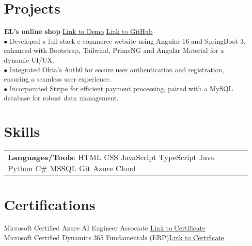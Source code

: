 \documentclass[letterpaper,12pt]{article}
\begin{document}
\section{Projects}

\textbf{EL's online shop} \hfill \href{https://youtu.be/q0_N9ydf67c}{Link to Demo} \hspace{0.2cm} \href{https://github.com/Zicheng-Li/Angular-ecommerce-frontend}{Link to GitHub}\\
\hspace{0.1cm} $\bullet$ \hspace{0.35em}Developed a full-stack e-commerce website using Angular 16 and SpringBoot 3, enhanced with Bootstrap, Tailwind, PrimeNG and Angular Material for a dynamic UI/UX. \\
\hspace{0.1cm} $\bullet$ \hspace{0.35em}Integrated Okta's Auth0 for secure user authentication and registration, ensuring a seamless user experience. \\ 
\hspace{0.1cm} $\bullet$ \hspace{0.35em}Incorporated Stripe for efficient payment processing, paired with a MySQL database for robust data management.

\section{Skills}
\begin{tabularx}{\linewidth}{@{}l X@{}}
\textbf{Languages/Tools}:  HTML \hspace{0.05cm} CSS \hspace{0.05cm} JavaScript \hspace{0.05cm} TypeScript \hspace{0.05cm} Java \hspace{0.05cm} Python \hspace{0.05cm} C\# \hspace{0.05cm} MSSQL \hspace{0.05cm} Git \hspace{0.19cm}Azure Cloud 
\end{tabularx}

\section{Certifications}
Microsoft Certified Azure AI Engineer Associate \hfill \href{https://learn.microsoft.com/en-us/users/zichengli-4388/credentials/8f80de9e7944a10}{Link to Certificate}\\
Microsoft Certified Dynamics 365 Fundamentals (ERP)\hfill \href{https://learn.microsoft.com/en-us/users/zichengli-4388/credentials/5d28421aefedb4ec}{Link to Certificate}
\end{document}
